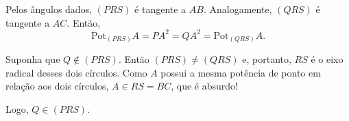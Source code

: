 Pelos ângulos dados, $(PRS)$ é tangente a $AB$. Analogamente, $(QRS)$ é tangente a $AC$. Então, \[\mathrm{Pot}_{(PRS)}A = PA^2 = QA^2 = \mathrm{Pot}_{(QRS)}A.\]

Suponha que $Q \not\in (PRS)$. Então $(PRS) \neq (QRS)$ e, portanto, $RS$ é o eixo radical desses dois círculos. Como $A$ possui a mesma potência de ponto em relação aos dois círculos, $A \in RS = BC$, que é absurdo!

Logo, $Q \in (PRS)$.
